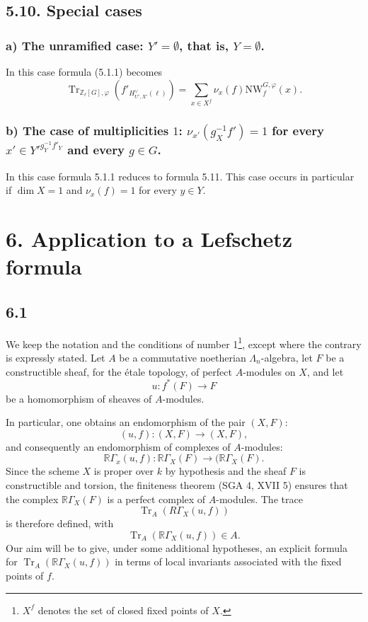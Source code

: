 \documentclass[11pt]{article}
\providecommand{\Tr}{\operatorname{Tr}}
\providecommand{\Tr}{\operatorname{Tr}}
\providecommand{\Tr}{\operatorname{Tr}}
\providecommand{\Tr}{\operatorname{Tr}}
\providecommand{\La}{\Lambda}
\providecommand{\bZ}{\mathbb Z}
\providecommand{\Tr}{\operatorname{Tr}}
\begin{document}
\subsection*{5.10. Special cases}
\subsubsection*{a) The unramified case: $Y'=\emptyset$, that is, $Y=\emptyset$.}
In this case formula (5.1.1) becomes
\begin{equation}\tag{5.11}
\Tr_{\bZ_\ell[G],\varphi}(f'_{H^\vee_{U',X'}(\ell)})
=
\sum_{x\in X^f}\nu_x(f)\mathrm{NW}_f^{G,\varphi}(x).
\end{equation}

\subsubsection*{b) The case of multiplicities $1$: $\nu_{x'}(g_{X}^{-1}f')=1$ for every $x'\in {Y'}^{g_{Y}^{-1}f'_{Y}}$ and every $g\in G$.}
In this case formula 5.1.1 reduces to formula 5.11. This case occurs in particular if $\dim X=1$ and $\nu_x(f)=1$ for every $y\in Y$.

\section*{6. Application to a Lefschetz formula}

\subsection*{6.1}
We keep the notation and the conditions of number 1\footnote{$X^f$ denotes the set of closed fixed points of $X$.}, except where the contrary is expressly stated. Let $A$ be a commutative noetherian $\La_n$-algebra, let $F$ be a constructible sheaf, for the étale topology, of perfect $A$-modules on $X$, and let
\[
u:f^*(F)\longrightarrow F
\]
be a homomorphism of sheaves of $A$-modules.

In particular, one obtains an endomorphism of the pair $(X,F)$:
\[
(u,f):(X,F)\longrightarrow (X,F),
\]
and consequently an endomorphism of complexes of $A$-modules:
\[
\mathbb{R}\Gamma_x(u,f):\mathbb{R}\Gamma_X(F)\longrightarrow (\mathbb{R}\Gamma_X(F).
\]
Since the scheme $X$ is proper over $k$ by hypothesis and the sheaf $F$ is constructible and torsion, the finiteness theorem (SGA 4, XVII 5) ensures that the complex $\mathbb{R}\Gamma_X(F)$ is a perfect complex of $A$-modules. The trace
\[
\Tr_A(R\Gamma_X(u,f))
\]
is therefore defined, with
\[
\Tr_A(\mathbb{R}\Gamma_X(u,f))\in A.
\]
Our aim will be to give, under some additional hypotheses, an explicit formula for $\Tr_A(\mathbb{R}\Gamma_X(u,f))$ in terms of local invariants associated with the fixed points of $f$.
\end{document}
